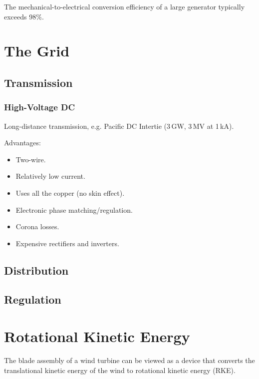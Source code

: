 \documentclass[11pt]{article}
\begin{document}
The mechanical-to-electrical conversion efficiency of a large
generator typically exceeds 98\%.



\section{The Grid}

\subsection{Transmission}

\subsubsection{High-Voltage DC}

Long-distance transmission, e.g. Pacific DC Intertie (3\,\unit{GW}, 3\,\unit{MV} at 1\,\unit{kA}).

Advantages:
\begin{itemize}
  \item Two-wire. 
  \item Relatively low current. 
  \item Uses all the copper (no skin effect).
  \item Electronic phase matching/regulation.
\end{itemize}

\begin{itemize}
  \item Corona losses.
  \item Expensive rectifiers and inverters.
\end{itemize}

\subsection{Distribution}


\subsection{Regulation}





\section{Rotational Kinetic Energy}

The blade assembly of a wind turbine can be viewed as a device that
converts the translational kinetic energy of the wind to rotational
kinetic energy (RKE).
\end{document}
